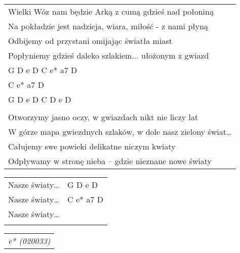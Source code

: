 \documentclass[a5paper]{article}
\begin{document}
\noindent
\begin{tabular}{@{}p{9.50cm}@{}}
Wielki Wóz nam będzie Arką z cumą gdzieś nad połoniną \\
Na pokładzie jest nadzieja, wiara, miłość - z nami płyną \\
Odbijemy od przystani omijając światła miast \\
Popłyniemy gdzieś daleko szlakiem... ułożonym z gwiazd \\
G D e D C e* a7 D \\
C e* a7 D \\
G D e D C D e D \\ \\

Otworzymy jasno oczy, w gwiazdach nikt nie liczy lat \\
W górze mapa gwiezdnych szlaków, w dole nasz zielony świat… \\
Całujemy swe powieki delikatne niczym kwiaty \\
Odpływamy w stronę nieba – gdzie nieznane nowe światy \\
\end{tabular}

\noindent
\begin{tabular}{@{}p{9.50cm}p{3cm}@{}}
Nasze światy… & G D e D \\
Nasze światy… & C e* a7 D \\
Nasze światy… & \\ \\
\end{tabular}

\noindent
\begin{tabular}{@{}p{9.50cm}@{}}
\emph{e* (020033)}
\end{tabular}
\end{document}
